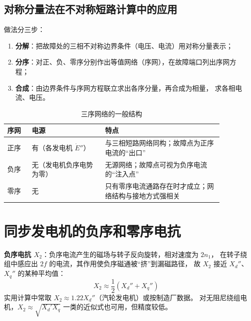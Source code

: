 \subsection{对称分量法在不对称短路计算中的应用}

做法分三步：
\begin{enumerate}
  \item \textbf{分解}：把故障处的三相不对称边界条件（电压、电流）用对称分量表示；
  \item \textbf{分序}：对正、负、零序分别作出等值网络（序网），在故障端口列出序网方程；
  \item \textbf{合成}：由边界条件与序网方程联立求出各序分量，再合成为相量，
        求各相电流、电压。
\end{enumerate}

\begin{table}[htbp]
  \centering
  \caption{三序网络的一般结构}
  \small
  \begin{tabular}{@{}p{0.10\linewidth}p{0.30\linewidth}p{0.48\linewidth}@{}}
    \toprule
    序网 & 电源 & 特点 \\
    \midrule
    正序 & 有（各发电机 $\dot E''$） & 与三相短路网络同构；故障点为正序电流的“出口” \\
    负序 & 无（发电机负序电势为零） & 无源网络；故障点可视为负序电流的“注入点” \\
    零序 & 无 & 只有零序电流通路存在时才成立；网络结构与接地方式强相关 \\
    \bottomrule
  \end{tabular}
\end{table}


\section{同步发电机的负序和零序电抗}

\textbf{负序电抗 $X_2$}：负序电流产生的磁场与转子反向旋转，相对速度为 $2n_1$，
在转子绕组中感应出 $2f$ 的电流，其作用使负序磁通被“挤”到漏磁路径，
故 $X_2$ 接近 $X_d''$、$X_q''$ 的某种平均值：
\begin{equation}
  X_2\approx\frac{1}{2}\left(X_d''+X_q''\right)
\end{equation}
实用计算中常取 $X_2\approx1.22X_d''$（汽轮发电机）或按制造厂数据。
对无阻尼绕组电机，$X_2\approx\sqrt{X_d'X_q}$ 一类的近似式也可用，但精度较低。

